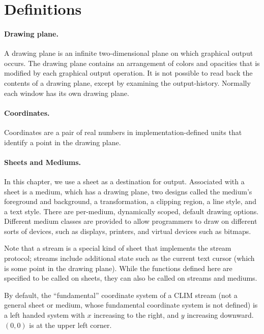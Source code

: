 \section {Definitions}

\paragraph {Drawing plane.}

A drawing plane is an infinite two-dimensional plane on which graphical output
occurs.  The drawing plane contains an arrangement of colors and opacities that
is modified by each graphical output operation.  It is not possible to read back
the contents of a drawing plane, except by examining the output-history.
Normally each window has its own drawing plane.

\paragraph {Coordinates.}

Coordinates are a pair of real numbers in implementation-defined units that
identify a point in the drawing plane.

\paragraph {Sheets and Mediums.}

In this chapter, we use a sheet as a destination for output.  Associated with a
sheet is a medium, which has a drawing plane, two designs called the medium's
foreground and background, a transformation, a clipping region, a line style,
and a text style.  There are per-medium, dynamically scoped, default drawing
options.  Different medium classes are provided to allow programmers to draw on
different sorts of devices, such as displays, printers, and virtual devices such
as bitmaps.

Note that a stream is a special kind of sheet that implements the stream
protocol; streams include additional state such as the current text cursor
(which is some point in the drawing plane).  While the functions defined here
are specified to be called on sheets, they can also be called on streams and
mediums.

By default, the ``fundamental'' coordinate system of a CLIM stream (not a
general sheet or medium, whose fundamental coordinate system is not defined) is
a left handed system with $x$ increasing to the right, and $y$ increasing
downward.  $(0,0)$ is at the upper left corner.


